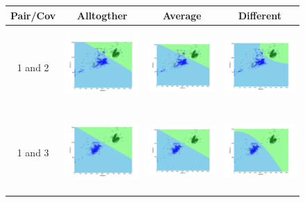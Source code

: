 \documentclass[a4paper]{article}
\begin{document}
			\begin{figure}
				\begin{tabular}{|c|c|c|c|}
					\hline
					Pair/Cov &  Alltogther & Average & Different	\\
					\hline
					1 and
					2&\includegraphics[width=40mm,height=30mm]{naivebayes/real/pair/12/all_cov.png}&\includegraphics[width=40mm,height=30mm]{naivebayes/real/pair/12/avg_cov.png}
					&\includegraphics[width=40mm,height=30mm]{naivebayes/real/pair/12/diff_cov.png}\\
					\hline
					1 and
					3&\includegraphics[width=40mm,height=30mm]{naivebayes/real/pair/13/all_cov.png}&\includegraphics[width=40mm,height=30mm]{naivebayes/real/pair/13/all_cov.png}
					&\includegraphics[width=40mm,height=30mm]{naivebayes/real/pair/13/diff_cov.png}\\

\end{tabular}
\end{figure}
\end{document}
